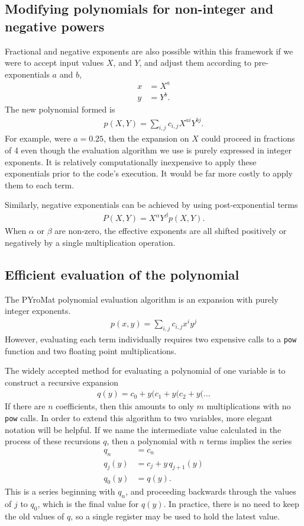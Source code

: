 \documentclass[twocolumn,letterpaper,11pt]{article}
\begin{document}
\subsection{Modifying polynomials for non-integer and negative powers}
Fractional and negative exponents are also possible within this framework if we were to accept input values $X$, and $Y$, and adjust them according to pre-exponentials $a$ and $b$,
\begin{align}
x &= X^a\\
y &= Y^b.
\end{align}
The new polynomial formed is
\begin{align}
p(X,Y) = \sum_{i,j} c_{i,j} X^{ai} Y^{bj}.
\end{align}
For example, were $a=0.25$, then the expansion on $X$ could proceed in fractions of 4 even though the evaluation algorithm we use is purely expressed in integer exponents.  It is relatively computationally inexpensive to apply these exponentials prior to the code's execution.  It would be far more costly to apply them to each term.

Similarly, negative exponentials can be achieved by using post-exponential terms
\begin{align}
P(X,Y) = X^\alpha Y^\beta p(X,Y).
\end{align}
When $\alpha$ or $\beta$ are non-zero, the effective exponents are all shifted positively or negatively by a single multiplication operation.

\subsection{Efficient evaluation of the polynomial}

The PYroMat polynomial evaluation algorithm is an expansion with purely integer exponents.
\begin{align}
p(x,y) = \sum_{i,j} c_{i,j} x^i y^j
\end{align}
However, evaluating each term individually requires two expensive calls to a \verb|pow| function and two floating point multiplications.

The widely accepted method for evaluating a polynomial of one variable is to construct a recursive expansion
\begin{align}
q(y) = c_0 + y ( c_1 + y ( c_2 + y ( \ldots
\end{align}
If there are $n$ coefficients, then this amounts to only $m$ multiplications with no \verb|pow| calls.  In order to extend this algorithm to two variables, more elegant notation will be helpful.  If we name the intermediate value calculated in the process of these recursions $q$, then a polynomial with $n$ terms implies the series
\begin{align}
q_n &= c_n\\
q_j(y) &= c_j + y\,q_{j+1}(y)\\
q_0(y) &= q(y).
\end{align}
This is a series beginning with $q_n$, and proceeding backwards through the values of $j$ to $q_0$, which is the final value for $q(y)$.  In practice, there is no need to keep the old values of $q$, so a single register may be used to hold the latest value.
\end{document}
